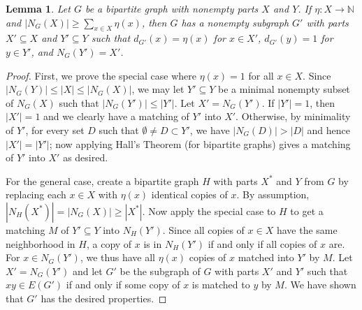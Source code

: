 \documentclass[12pt]{amsart}
\theoremstyle{plain}
\newtheorem{lem}[thm]{Lemma}
\theoremstyle{definition}
\theoremstyle{remark}
\newcommand{\IN}{\mathbb{N}}
\newcommand{\card}[1]{\left|#1\right|}
\newcommand{\func}[3]{#1\colon #2 \rightarrow #3}
\newcommand{\myhat}[1]{#1^*}
\begin{document}
\begin{lem}\label{Spanner}
Let $G$ be a bipartite graph with nonempty parts $X$ and $Y$. If $\func{\eta}{X}{\IN}$ and $\card{N_G(X)} \ge \sum_{x \in X} \eta(x)$, then $G$ has a nonempty subgraph $G'$ with parts $X' \subseteq X$ and $Y' \subseteq Y$ such that $d_{G'}(x) = \eta(x)$ for $x \in X'$, $d_{G'}(y) = 1$ for $y \in Y'$, and $N_G(Y') = X'$.
\end{lem}
\begin{proof}
First, we prove the special case where $\eta(x) = 1$ for all $x \in X$. Since $\card{N_{G}(Y)} \le |X| \le \card{N_G(X)}$, we may let $Y' \subseteq Y$ be a minimal nonempty subset of $N_G(X)$ such that $\card{N_{G}(Y')} \le \card{Y'}$. Let $X' = N_G(Y')$. If $\card{Y'} = 1$, then $\card{X'} = 1$ and we clearly have a matching of $Y'$ into $X'$.  Otherwise, by minimality of $Y'$, for every set $D$ such that $\emptyset \ne D \subset Y'$, we have $\card{N_{G}(D)} > \card{D}$ and hence $\card{X'} = \card{Y'}$; now applying Hall's Theorem (for bipartite graphs) gives a matching of $Y'$ into $X'$ as desired.

For the general case, create a bipartite graph $H$ with parts $\myhat{X}$ and $Y$ from $G$ by replacing each $x \in X$ with $\eta(x)$ identical copies of $x$.  By assumption, $\card{N_{H}(\myhat{X})} = \card{N_G(X)} \ge \card{\myhat{X}}$.  Now apply the special case to $H$ to get a matching $M$ of $Y' \subseteq Y$ into $N_H(Y')$.  Since all copies of $x\in X$ have the same neighborhood in $H$, a copy of $x$ is in $N_H(Y')$ if and only if all copies of $x$ are.  For $x\in N_G(Y')$, we thus have all $\eta(x)$ copies of $x$ matched into $Y'$ by $M$.  Let $X' = N_G(Y')$ and let $G'$ be the subgraph of $G$ with parts $X'$ and $Y'$ such that $xy\in E(G')$ if and only if some copy of $x$ is matched to $y$ by $M$.  We have shown that $G'$ has the desired properties.
\end{proof}
\end{document}
